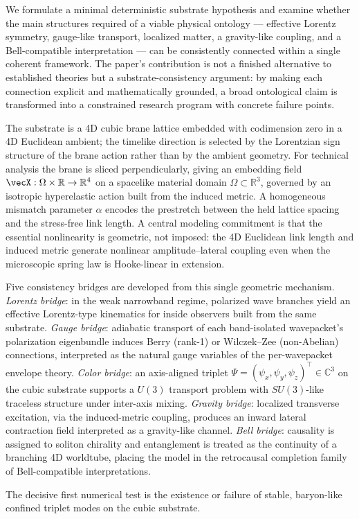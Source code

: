 We formulate a minimal deterministic substrate hypothesis and examine whether the main structures required of a viable physical ontology --- effective Lorentz symmetry, gauge-like transport, localized matter, a gravity-like coupling, and a Bell-compatible interpretation --- can be consistently connected within a single coherent framework.
The paper's contribution is not a finished alternative to established theories but a substrate-consistency argument: by making each connection explicit and mathematically grounded, a broad ontological claim is transformed into a constrained research program with concrete failure points.

The substrate is a 4D cubic brane lattice embedded with codimension zero in a 4D Euclidean ambient; the timelike direction is selected by the Lorentzian sign structure of the brane action rather than by the ambient geometry.
For technical analysis the brane is sliced perpendicularly, giving an embedding field $\vecX:\Omega\times\mathbb{R}\to\mathbb{R}^4$ on a spacelike material domain $\Omega\subset\mathbb{R}^3$, governed by an isotropic hyperelastic action built from the induced metric.
A homogeneous mismatch parameter $\alpha$ encodes the prestretch between the held lattice spacing and the stress-free link length.
A central modeling commitment is that the essential nonlinearity is geometric, not imposed: the 4D Euclidean link length and induced metric generate nonlinear amplitude--lateral coupling even when the microscopic spring law is Hooke-linear in extension.

Five consistency bridges are developed from this single geometric mechanism.
\emph{Lorentz bridge}: in the weak narrowband regime, polarized wave branches yield an effective Lorentz-type kinematics for inside observers built from the same substrate.
\emph{Gauge bridge}: adiabatic transport of each band-isolated wavepacket's polarization eigenbundle induces Berry (rank-1) or Wilczek--Zee (non-Abelian) connections, interpreted as the natural gauge variables of the per-wavepacket envelope theory.
\emph{Color bridge}: an axis-aligned triplet $\Psi=(\psi_x,\psi_y,\psi_z)^\top\in\mathbb{C}^3$ on the cubic substrate supports a $U(3)$ transport problem with $SU(3)$-like traceless structure under inter-axis mixing.
\emph{Gravity bridge}: localized transverse excitation, via the induced-metric coupling, produces an inward lateral contraction field interpreted as a gravity-like channel.
\emph{Bell bridge}: causality is assigned to soliton chirality and entanglement is treated as the continuity of a branching 4D worldtube, placing the model in the retrocausal completion family of Bell-compatible interpretations.

The decisive first numerical test is the existence or failure of stable, baryon-like confined triplet modes on the cubic substrate.